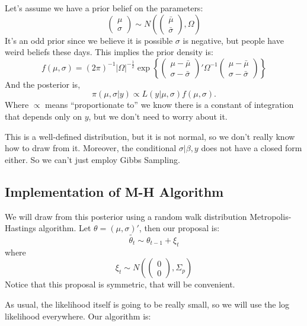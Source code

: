 \documentclass[twoside]{article}
\begin{document}
Let's assume we have a prior belief on the parameters: 
$$\begin{pmatrix} \mu  \\ \sigma \end{pmatrix} \sim N \left( \begin{pmatrix} \bar{\mu} \\ \bar{\sigma} \end{pmatrix}, \Omega \right) $$
It's an odd prior since we believe it is possible $\sigma$ is negative, but people have weird beliefs these days. This implies the prior density is: 
$$f(\mu, \sigma) = (2\pi)^{-1} | \Omega |^{-\frac{1}{2}} \exp \left \{ \begin{pmatrix} \mu - \bar{\mu} \\ \sigma - \bar{\sigma} \end{pmatrix}' \Omega^{-1} 
\begin{pmatrix} \mu - \bar{\mu} \\ \sigma - \bar{\sigma} \end{pmatrix} \right\}$$
And the posterior is, 
$$\pi(\mu, \sigma | y) \propto L(y | \mu, \sigma) f(\mu, \sigma).$$ 
Where $\propto$ means ``proportionate to'' we know there is a constant of integration that depends only on $y$, but we don't need to worry about it. 

This is a well-defined distribution, but it is not normal, so we don't really know how to draw from it. Moreover, the conditional $\sigma | \beta, y$ does
not have a closed form either. So we can't just employ Gibbs Sampling. 

\subsection{Implementation of M-H Algorithm}

We will draw from this posterior using a random walk distribution Metropolis-Hastings algorithm. Let $\theta = (\mu, \sigma)'$, then our
proposal is: $$ \tilde{\theta_t} \sim \theta_{t-1} + \xi_t $$
where
$$ \xi_t \sim N \left(  \begin{pmatrix} 0\\ 0 \end{pmatrix}, \Sigma_p \right) $$
Notice that this proposal is symmetric, that will be convenient. 

As usual, the likelihood itself is going to be really small, so we will use the log likelihood everywhere. Our algorithm is: 
\end{document}
